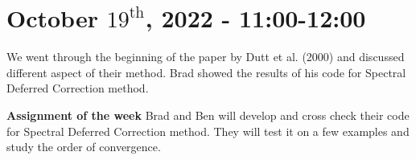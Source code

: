 \documentclass[11pt]{article}
\theoremstyle{definition}
\begin{document}
\section{October $19^{\text{th}}$, 2022 - 11:00-12:00}

We went through the beginning of the paper by Dutt et al. (2000) and discussed different aspect of their method. Brad showed the results of his code for Spectral Deferred Correction method.

\begin{shaded}
\textbf{Assignment of the week} \newline
Brad and Ben will develop and cross check their code for Spectral Deferred Correction method. They will test it on a few examples and study the order of convergence.
\end{shaded}
\end{document}
